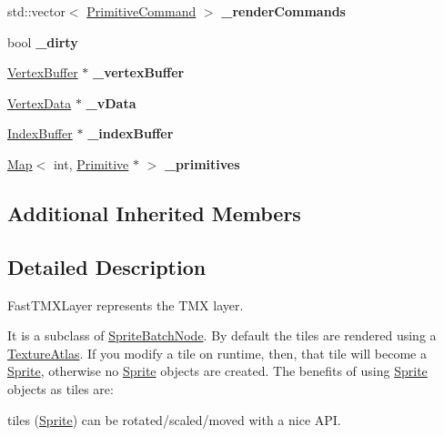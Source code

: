 \begin{DoxyCompactItemize}
\mbox{\label{classexperimental_1_1TMXLayer_a232d61d25a388245c44bca9878feb1bb}} 
std\+::vector$<$ \hyperlink{classPrimitiveCommand}{Primitive\+Command} $>$ {\bfseries \+\_\+render\+Commands}
\item 
\mbox{\label{classexperimental_1_1TMXLayer_a94f5819fe1ae7180f411800a81d1b66d}} 
bool {\bfseries \+\_\+dirty}
\item 
\mbox{\label{classexperimental_1_1TMXLayer_a3841ea788549feb18f1f9c034b95d5c5}} 
\hyperlink{classVertexBuffer}{Vertex\+Buffer} $\ast$ {\bfseries \+\_\+vertex\+Buffer}
\item 
\mbox{\label{classexperimental_1_1TMXLayer_a618bbf4f5296c5904b556a58bcb9fed1}} 
\hyperlink{classVertexData}{Vertex\+Data} $\ast$ {\bfseries \+\_\+v\+Data}
\item 
\mbox{\label{classexperimental_1_1TMXLayer_ab5c5843571a4940f4c27816dd7be893d}} 
\hyperlink{classIndexBuffer}{Index\+Buffer} $\ast$ {\bfseries \+\_\+index\+Buffer}
\item 
\mbox{\label{classexperimental_1_1TMXLayer_aecbba2745ef817e8c118d42087af656e}} 
\hyperlink{classMap}{Map}$<$ int, \hyperlink{classPrimitive}{Primitive} $\ast$ $>$ {\bfseries \+\_\+primitives}
\end{DoxyCompactItemize}
\subsection*{Additional Inherited Members}


\subsection{Detailed Description}
Fast\+T\+M\+X\+Layer represents the T\+MX layer. 

It is a subclass of \hyperlink{classSpriteBatchNode}{Sprite\+Batch\+Node}. By default the tiles are rendered using a \hyperlink{classTextureAtlas}{Texture\+Atlas}. If you modify a tile on runtime, then, that tile will become a \hyperlink{classSprite}{Sprite}, otherwise no \hyperlink{classSprite}{Sprite} objects are created. The benefits of using \hyperlink{classSprite}{Sprite} objects as tiles are\+:
\begin{DoxyItemize}
\item tiles (\hyperlink{classSprite}{Sprite}) can be rotated/scaled/moved with a nice A\+PI.
\end{DoxyItemize}

